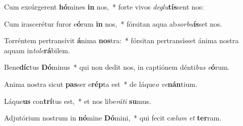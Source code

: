 \item Cum exsúrgerent \textbf{hó}mines \textbf{in} nos,~* forte vivos \textit{de}\textit{glu}\textbf{tís}sent nos:
\item Cum irascerétur furor e\textbf{ó}rum \textbf{in} nos,~* fórsitan aqua ab\textit{sor}\textit{bu}\textbf{ís}set nos.
\item Torréntem pertransívit \textbf{á}nima \textbf{nos}tra:~* fórsitan pertransísset ánima nostra aquam in\textit{to}\textit{le}\textbf{rá}bilem.
\item Bene\textbf{díc}tus \textbf{Dó}minus~* qui non dedit nos, in captiónem dénti\textit{bus} \textit{e}\textbf{ó}rum.
\item Anima nostra sicut \textbf{pas}ser e\textbf{rép}ta est~* de láque\textit{o} \textit{ve}\textbf{nán}tium.
\item Láque\textbf{us} con\textbf{trí}tus est,~* et nos libe\textit{rá}\textit{ti} \textbf{su}mus.
\item Adjutórium nostrum in \textbf{nó}mine \textbf{Dó}mini,~* qui fecit cæ\textit{lum} \textit{et} \textbf{ter}ram.
